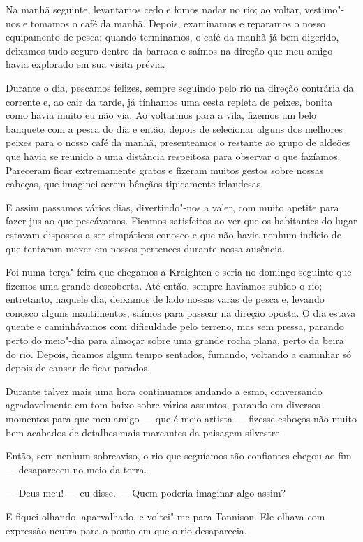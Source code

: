 Na manhã seguinte, levantamos cedo e fomos nadar no rio; ao voltar, vestimo"-nos e tomamos o café da manhã. Depois,
examinamos e reparamos o nosso equipamento de pesca; quando terminamos, o café da manhã já bem digerido, deixamos tudo
seguro dentro da barraca e saímos na direção que meu amigo havia explorado em sua visita prévia.

Durante o dia, pescamos felizes, sempre seguindo pelo rio na direção contrária da corrente e, ao cair da tarde, já
tínhamos uma cesta repleta de peixes, bonita como havia muito eu não via. Ao voltarmos para a vila, fizemos um belo
banquete com a pesca do dia e então, depois de selecionar alguns dos melhores peixes para o nosso café da manhã,
presenteamos o restante ao grupo de aldeões que havia se reunido a uma distância respeitosa para observar o que
fazíamos. Pareceram ficar extremamente gratos e fizeram muitos gestos sobre nossas cabeças, que imaginei serem bênçãos
tipicamente irlandesas.

E assim passamos vários dias, divertindo"-nos a valer, com muito apetite para fazer jus ao que pescávamos. Ficamos
satisfeitos ao ver que os habitantes do lugar estavam dispostos a ser simpáticos conosco e que não havia nenhum
indício de que tentaram mexer em nossos pertences durante nossa ausência.

Foi numa terça"-feira que chegamos a Kraighten e seria no domingo seguinte que fizemos uma grande descoberta. Até então,
sempre havíamos subido o rio; entretanto, naquele dia, deixamos de lado nossas varas de pesca e, levando conosco alguns
mantimentos, saímos para passear na direção oposta. O dia estava quente e caminhávamos com dificuldade pelo terreno,
mas sem pressa, parando perto do meio"-dia para almoçar sobre uma grande rocha plana, perto da beira do rio. Depois,
ficamos algum tempo sentados, fumando, voltando a caminhar só depois de cansar de ficar parados.

Durante talvez mais uma hora continuamos andando a esmo, conversando agradavelmente em tom baixo sobre vários assuntos,
parando em diversos momentos para que meu amigo --- que é meio artista --- fizesse esboços não muito bem acabados de
detalhes mais marcantes da paisagem silvestre.

Então, sem nenhum sobreaviso, o rio que seguíamos tão confiantes chegou ao fim --- desapareceu no meio da terra.

--- Deus meu! --- eu disse. --- Quem poderia imaginar algo assim?

E fiquei olhando, aparvalhado, e voltei"-me para Tonnison. Ele olhava com expressão neutra para o ponto em que o
rio desaparecia.

